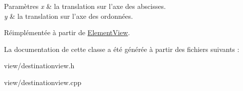 \begin{DoxyParams}{Paramètres}
{\em x} & la translation sur l’axe des abscisses. \\
\hline
{\em y} & la translation sur l’axe des ordonnées. \\
\hline
\end{DoxyParams}


Réimplémentée à partir de \hyperlink{classElementView_a69a525cb674a36e33be6a8b7a6e4b83c}{Element\+View}.



La documentation de cette classe a été générée à partir des fichiers suivants \+:\begin{DoxyCompactItemize}
\item 
view/destinationview.\+h\item 
view/destinationview.\+cpp\end{DoxyCompactItemize}
